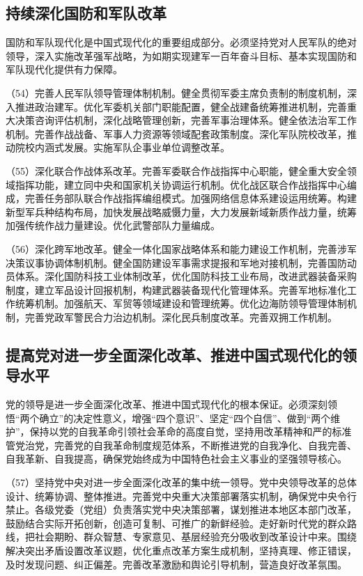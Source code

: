     \subsection{持续深化国防和军队改革}

    国防和军队现代化是中国式现代化的重要组成部分。必须坚持党对人民军队的绝对领导，深入实施改革强军战略，为如期实现建军一百年奋斗目标、基本实现国防和军队现代化提供有力保障。

    （54）完善人民军队领导管理体制机制。健全贯彻军委主席负责制的制度机制，深入推进政治建军。优化军委机关部门职能配置，健全战建备统筹推进机制，完善重大决策咨询评估机制，深化战略管理创新，完善军事治理体系。健全依法治军工作机制。完善作战战备、军事人力资源等领域配套政策制度。深化军队院校改革，推动院校内涵式发展。实施军队企事业单位调整改革。

    （55）深化联合作战体系改革。完善军委联合作战指挥中心职能，健全重大安全领域指挥功能，建立同中央和国家机关协调运行机制。优化战区联合作战指挥中心编成，完善任务部队联合作战指挥编组模式。加强网络信息体系建设运用统筹。构建新型军兵种结构布局，加快发展战略威慑力量，大力发展新域新质作战力量，统筹加强传统作战力量建设。优化武警部队力量编成。

    （56）深化跨军地改革。健全一体化国家战略体系和能力建设工作机制，完善涉军决策议事协调体制机制。健全国防建设军事需求提报和军地对接机制，完善国防动员体系。深化国防科技工业体制改革，优化国防科技工业布局，改进武器装备采购制度，建立军品设计回报机制，构建武器装备现代化管理体系。完善军地标准化工作统筹机制。加强航天、军贸等领域建设和管理统筹。优化边海防领导管理体制机制，完善党政军警民合力治边机制。深化民兵制度改革。完善双拥工作机制。

    \subsection{提高党对进一步全面深化改革、推进中国式现代化的领导水平}

    党的领导是进一步全面深化改革、推进中国式现代化的根本保证。必须深刻领悟“两个确立”的决定性意义，增强“四个意识”、坚定“四个自信”、做到“两个维护”，保持以党的自我革命引领社会革命的高度自觉，坚持用改革精神和严的标准管党治党，完善党的自我革命制度规范体系，不断推进党的自我净化、自我完善、自我革新、自我提高，确保党始终成为中国特色社会主义事业的坚强领导核心。

    （57）坚持党中央对进一步全面深化改革的集中统一领导。党中央领导改革的总体设计、统筹协调、整体推进。完善党中央重大决策部署落实机制，确保党中央令行禁止。各级党委（党组）负责落实党中央决策部署，谋划推进本地区本部门改革，鼓励结合实际开拓创新，创造可复制、可推广的新鲜经验。走好新时代党的群众路线，把社会期盼、群众智慧、专家意见、基层经验充分吸收到改革设计中来。围绕解决突出矛盾设置改革议题，优化重点改革方案生成机制，坚持真理、修正错误，及时发现问题、纠正偏差。完善改革激励和舆论引导机制，营造良好改革氛围。


